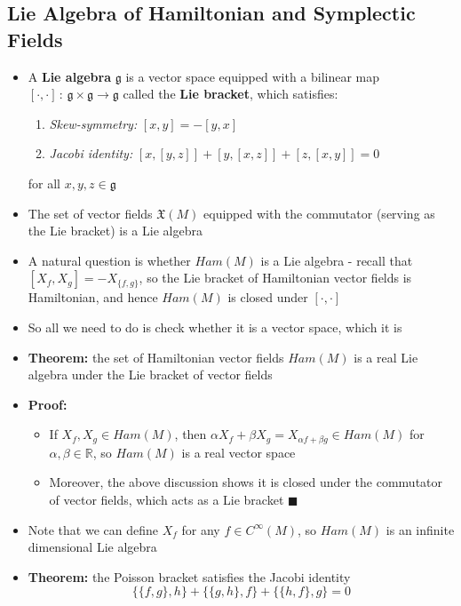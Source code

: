 \documentclass[12pt,a4paper]{article}
\numberwithin{equation}{section}
\begin{document}
	\subsection{Lie Algebra of Hamiltonian and Symplectic Fields}
	\begin{itemize}
		\item A \textbf{Lie algebra} $\mathfrak{g}$ is a vector space equipped with a bilinear map $[\cdot,\cdot]\,:\,\mathfrak{g}\times\mathfrak{g}\to\mathfrak{g}$ called the \textbf{Lie bracket}, which satisfies:
		\begin{enumerate}
			\item \textit{Skew-symmetry:} $[x,y]=-[y,x]$
			\item \textit{Jacobi identity:} $[x,[y,z]]+[y,[x,z]]+[z,[x,y]]=0$
		\end{enumerate}
		for all $x,y,z\in\mathfrak{g}$
		\item The set of vector fields $\mathfrak{X}(M)$ equipped with the commutator (serving as the Lie bracket) is a Lie algebra
		\item A natural question is whether $Ham(M)$ is a Lie algebra - recall that $[X_{f},X_{g}]=-X_{\{f,g\}}$, so the Lie bracket of Hamiltonian vector fields is Hamiltonian, and hence $Ham(M)$ is closed under $[\cdot,\cdot]$
		\item So all we need to do is check whether it is a vector space, which it is
		\item \textbf{Theorem:} the set of Hamiltonian vector fields $Ham(M)$ is a real Lie algebra under the Lie bracket of vector fields
		\item \textbf{Proof:}
		\begin{itemize}
			\item If $X_{f},X_{g}\in Ham(M)$, then $\alpha X_{f}+\beta{X_{g}}=X_{\alpha f +\beta g} \in Ham(M)$ for $\alpha,\beta\in\mathbb{R}$, so $Ham(M)$ is a real vector space
			\item Moreover, the above discussion shows it is closed under the commutator of vector fields, which acts as a Lie bracket $\blacksquare$
		\end{itemize}
		\item Note that we can define $X_{f}$ for any $f \in C^{\infty}(M)$, so $Ham(M)$ is an infinite dimensional Lie algebra
		\item \textbf{Theorem:} the Poisson bracket satisfies the Jacobi identity
		\begin{equation}
			\{\{f,g\},h\}+\{\{g,h\},f\}+\{\{h,f\},g\}=0
		\end{equation}

\end{itemize}
\end{document}

